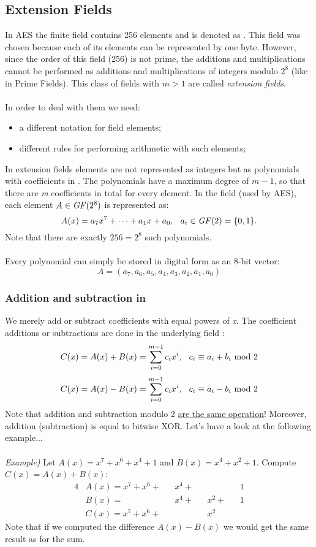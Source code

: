 \subsection{Extension Fields }
In AES the finite field contains 256 elements and is denoted as . This field was chosen because each of its elements can be represented by one byte. However, since the order of this field (256) is not prime, the additions and multiplications cannot be performed as additions and multiplications of integers modulo $2^8$ (like in Prime Fields). This class of fields  with $m>1$ are called \textit{extension fields}.\\\\
In order to deal with them we need:
\begin{itemize}
    \item a different notation for field elements;
    \item different rules for performing arithmetic with such elements;
\end{itemize}
In extension fields elements are not represented as integers but as polynomials with coefficients in . The polynomials have a maximum degree of $m-1$, so that there are \textit{m} coefficients in total for every element. In the field  (used by AES), each element $A\in\text{\textit{GF}($2^8$)}$ is represented as:
$$A(x)=a_7x^7+\cdots+a_1x+a_0,\hspace{0.25cm} a_i\in\text{\textit{GF}(2)}=\{0,1\}.$$
Note that there are exactly $256=2^8$ such polynomials.\\\\
Every polynomial can simply be stored in digital form as an 8-bit vector:
$$A=(a_7,a_6,a_5,a_4,a_3,a_2,a_1,a_0)$$

\subsubsection{Addition and subtraction in }
We merely add or subtract coefficients with equal powers of \textit{x}. The coefficient additions or subtractions are done in the underlying field :
$$C(x)=A(x)+B(x)=\displaystyle\sum_{i=0}^{m-1}c_ix^i,\hspace{0.25cm}c_i\equiv a_i+b_i\text{ mod }2$$
$$C(x)=A(x)-B(x)=\displaystyle\sum_{i=0}^{m-1}c_ix^i,\hspace{0.25cm}c_i\equiv a_i-b_i\text{ mod }2$$
Note that addition and subtraction modulo 2 \underline{are the same operation}! Moreover, addition (subtraction) is equal to bitwise XOR. Let's have a look at the following example...\\\\
\textit{Example)} Let $A(x)=x^7+x^6+x^4+1$ and $B(x)=x^4+x^2+1$. Compute $C(x)=A(x)+B(x)$:
\begin{alignat*}{4}
    &A(x)=x^7+x^6+&&x^4+&&&&1\\
    &B(x)=        &&x^4+&&x^2+&&1\\
    &C(x)=x^7+x^6+&&&&x^2
\end{alignat*}
Note that if we computed the difference $A(x)-B(x)$ we would get the same result as for the sum.

